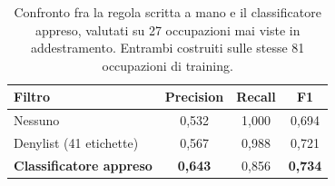 \begin{table}[htbp]
  \centering
  \caption{Confronto fra la regola scritta a mano e il classificatore appreso,
           valutati su 27 occupazioni mai viste in addestramento. Entrambi
           costruiti sulle stesse 81 occupazioni di training.}
  \label{tab:classificatore}
  \begin{tabular}{lccc}
    \toprule
    \textbf{Filtro} & \textbf{Precision} & \textbf{Recall} & \textbf{F1} \\
    \midrule
    Nessuno                        & 0,532 & 1,000 & 0,694 \\
    Denylist (41 etichette)        & 0,567 & 0,988 & 0,721 \\
    \textbf{Classificatore appreso} & \textbf{0,643} & 0,856 & \textbf{0,734} \\
    \bottomrule
  \end{tabular}
\end{table}

